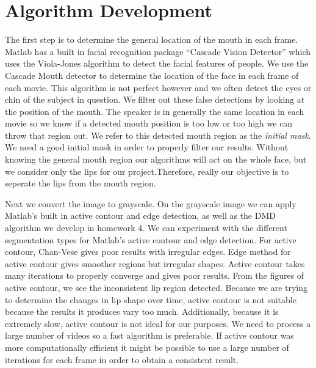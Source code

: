 \documentclass{article}
\begin{document}
\section{Algorithm Development}

The first step is to determine the general location of the mouth in each frame. Matlab has a built in facial recognition package ``Cascade Vision Detector'' which uses the Viola-Jones algorithm to detect the facial features of people. We use the Cascade Mouth detector to determine the location of the face in each frame of each movie. This algorithm is not perfect however and we often detect the eyes or chin of the subject in question. We filter out these false detections by looking at the position of the mouth. The speaker is in generally the same location in each movie so we know if a detected mouth position is too low or too high we can throw that region out. We refer to this detected mouth region as the \textit{initial mask}. We need a good initial mask in order to properly filter our results. Without knowing the general mouth region our algorithms will act on the whole face, but we consider only the lips for our project.Therefore, really our objective is to seperate the lips from the mouth region.\par
Next we convert the image to grayscale. On the grayscale image we can apply Matlab's built in active contour and edge detection, as well as the DMD algorithm we develop in homework 4. We can experiment with the different segmentation types for Matlab's active contour and edge detection. For active contour, Chan-Vese gives poor results with irregular edges. Edge method for active contour gives smoother regions but irregular shapes. Active contour takes many iterations to properly converge and gives poor results. From the figures of active contour, we see the inconsistent lip region detected. Because we are trying to determine the changes in lip shape over time, active contour is not suitable because the results it produces vary too much. Additionally, because it is extremely slow, active contour is not ideal for our purposes. We need to process a large number of videos so a fast algorithm is preferable. If active contour was more computationally efficient it might be possible to use a large number of iterations for each frame in order to obtain a consistent result.  \par
\end{document}
